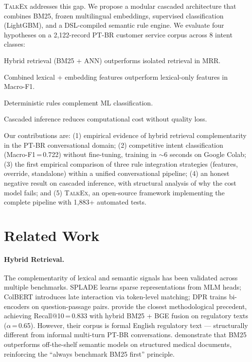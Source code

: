 \documentclass[11pt]{article}
\newcommand{\talkex}{\textsc{TalkEx}}
\newcommand{\macrof}{Macro-F1}
\begin{document}
\talkex{} addresses this gap. We propose a modular cascaded architecture that combines BM25, frozen multilingual embeddings, supervised classification (LightGBM), and a DSL-compiled semantic rule engine. We evaluate four hypotheses on a 2,122-record PT-BR customer service corpus across 8 intent classes:

\begin{description}[leftmargin=0.5cm,itemsep=2pt]
    \item[H1] Hybrid retrieval (BM25 + ANN) outperforms isolated retrieval in MRR.
    \item[H2] Combined lexical + embedding features outperform lexical-only features in \macrof{}.
    \item[H3] Deterministic rules complement ML classification.
    \item[H4] Cascaded inference reduces computational cost without quality loss.
\end{description}

Our contributions are: (1) empirical evidence of hybrid retrieval complementarity in the PT-BR conversational domain; (2) competitive intent classification (\macrof{}\,=\,0.722) without fine-tuning, training in $\sim$6 seconds on Google Colab; (3) the first empirical comparison of three rule integration strategies (features, override, standalone) within a unified conversational pipeline; (4) an honest negative result on cascaded inference, with structural analysis of why the cost model fails; and (5) \talkex{}, an open-source framework implementing the complete pipeline with 1,883+ automated tests.


\section{Related Work}
\label{sec:related}

\paragraph{Hybrid Retrieval.} The complementarity of lexical and semantic signals has been validated across multiple benchmarks. SPLADE \citep{formal2021splade} learns sparse representations from MLM heads; ColBERT \citep{khattab2020colbert} introduces late interaction via token-level matching; DPR \citep{karpukhin2020dense} trains bi-encoders on question-passage pairs. \citet{rayo2025hybrid} provide the closest methodological precedent, achieving Recall@10\,=\,0.833 with hybrid BM25 + BGE fusion on regulatory texts ($\alpha$\,=\,0.65). However, their corpus is formal English regulatory text --- structurally different from informal multi-turn PT-BR conversations. \citet{harris2024bm25} demonstrate that BM25 outperforms off-the-shelf semantic models on structured medical documents, reinforcing the ``always benchmark BM25 first'' principle.
\end{document}
